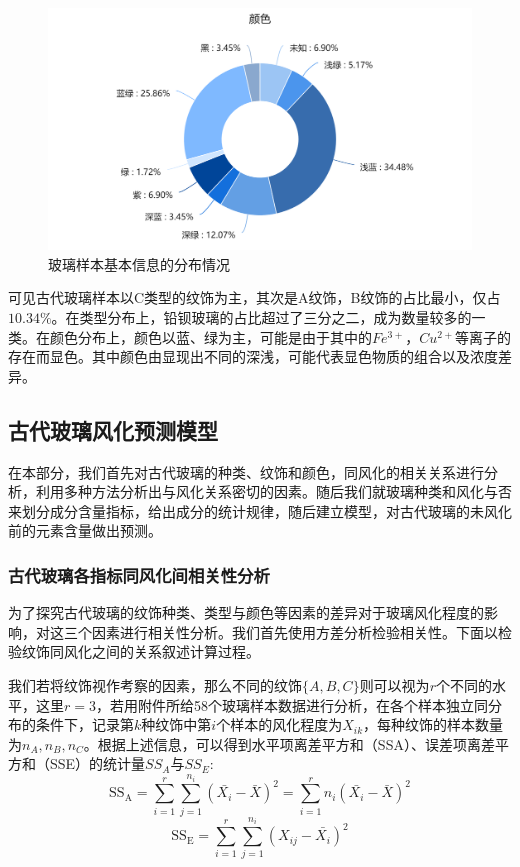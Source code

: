 \documentclass{my_paper}
\begin{document}
\begin{figure}[htbp]
{    \begin{minipage}{0.5\textwidth}
    \centering    %
    \includegraphics[width=\textwidth]{513ys.png}%
    \end{minipage}
    }
    \caption{玻璃样本基本信息的分布情况}    %
    \label{513}    %
\end{figure}
可见古代玻璃样本以C类型的纹饰为主，其次是A纹饰，B纹饰的占比最小，仅占$10.34\%$。在类型分布上，铅钡玻璃的占比超过了三分之二，成为数量较多的一类。在颜色分布上，颜色以蓝、绿为主，可能是由于其中的$Fe^{3+}$，$ Cu^{2+} $等离子的存在而显色\cite{3}。其中颜色由显现出不同的深浅，可能代表显色物质的组合以及浓度差异。
\subsection{古代玻璃风化预测模型}
在本部分，我们首先对古代玻璃的种类、纹饰和颜色，同风化的相关关系进行分析，利用多种方法分析出与风化关系密切的因素。随后我们就玻璃种类和风化与否来划分成分含量指标，给出成分的统计规律，随后建立模型，对古代玻璃的未风化前的元素含量做出预测。

\subsubsection{古代玻璃各指标同风化间相关性分析}
为了探究古代玻璃的纹饰种类、类型与颜色等因素的差异对于玻璃风化程度的影响，对这三个因素进行相关性分析。我们首先使用方差分析\cite{2}检验相关性。下面以检验纹饰同风化之间的关系叙述计算过程。

我们若将纹饰视作考察的因素，那么不同的纹饰$\{A,B,C\}$则可以视为$r$个不同的水平，这里$r=3$，若用附件所给58个玻璃样本数据进行分析，在各个样本独立同分布的条件下，记录第$k$种纹饰中第$i$个样本的风化程度为$X_{ik}$，每种纹饰的样本数量为$n_A,n_B,n_C$。根据上述信息，可以得到水平项离差平方和（SSA）、误差项离差平方和（SSE）的统计量$SS_A$与$SS_E$:
\begin{equation}
    \mathrm{SS}_{\mathrm{A}}=\sum_{i=1}^{r} \sum_{j=1}^{n_{i}}\left(\bar{X_{i}}-\bar{X}\right)^{2}=\sum_{i=1}^{r} n_{i}\left(\bar{X_{i}}-\bar{X}\right)^{2} 
\label{ssa}
\end{equation}
\begin{equation}
    \mathrm{SS}_{\mathrm{E}}=\sum_{i=1}^{r} \sum_{j=1}^{n_{i}}\left(X_{i j}-\bar{X_{i}}\right)^{2}
    \label{sse}
\end{equation}
\end{document}

